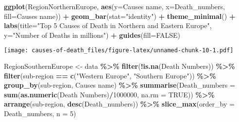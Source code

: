 \documentclass[
]{article}
\newenvironment{Shaded}{\begin{snugshade}}{\end{snugshade}}
\newcommand{\AttributeTok}[1]{\textcolor[rgb]{0.13,0.29,0.53}{#1}}
\newcommand{\ConstantTok}[1]{\textcolor[rgb]{0.56,0.35,0.01}{#1}}
\newcommand{\DecValTok}[1]{\textcolor[rgb]{0.00,0.00,0.81}{#1}}
\newcommand{\FunctionTok}[1]{\textcolor[rgb]{0.13,0.29,0.53}{\textbf{#1}}}
\newcommand{\NormalTok}[1]{#1}
\newcommand{\OtherTok}[1]{\textcolor[rgb]{0.56,0.35,0.01}{#1}}
\newcommand{\SpecialCharTok}[1]{\textcolor[rgb]{0.81,0.36,0.00}{\textbf{#1}}}
\newcommand{\StringTok}[1]{\textcolor[rgb]{0.31,0.60,0.02}{#1}}
\begin{document}
\begin{Shaded}
\begin{Highlighting}[]
\FunctionTok{ggplot}\NormalTok{(RegionNorthernEurope, }\FunctionTok{aes}\NormalTok{(}\AttributeTok{y=}\StringTok{\textasciigrave{}}\AttributeTok{Causes name}\StringTok{\textasciigrave{}}\NormalTok{, }\AttributeTok{x=}\NormalTok{Death\_numbers, }\AttributeTok{fill=}\StringTok{\textasciigrave{}}\AttributeTok{Causes name}\StringTok{\textasciigrave{}}\NormalTok{)) }\SpecialCharTok{+}
  \FunctionTok{geom\_bar}\NormalTok{(}\AttributeTok{stat=}\StringTok{"identity"}\NormalTok{) }\SpecialCharTok{+}
  \FunctionTok{theme\_minimal}\NormalTok{() }\SpecialCharTok{+} 
  \FunctionTok{labs}\NormalTok{(}\AttributeTok{title=}\StringTok{"Top 5 Causes of Death in Northern and Eastern Europe"}\NormalTok{,}
       \AttributeTok{y=}\StringTok{"Number of Deaths in millions"}\NormalTok{) }\SpecialCharTok{+}
  \FunctionTok{guides}\NormalTok{(}\AttributeTok{fill=}\ConstantTok{FALSE}\NormalTok{)}
\end{Highlighting}
\end{Shaded}

\texttt{[image: causes-of-death\_files/figure-latex/unnamed-chunk-10-1.pdf]}

\begin{Shaded}
\begin{Highlighting}[]
\NormalTok{RegionSouthernEurope }\OtherTok{\textless{}{-}}\NormalTok{ data }\SpecialCharTok{\%\textgreater{}\%}
  \FunctionTok{filter}\NormalTok{(}\SpecialCharTok{!}\FunctionTok{is.na}\NormalTok{(}\StringTok{\textasciigrave{}}\AttributeTok{Death Numbers}\StringTok{\textasciigrave{}}\NormalTok{)) }\SpecialCharTok{\%\textgreater{}\%}
  \FunctionTok{filter}\NormalTok{(}\StringTok{\textasciigrave{}}\AttributeTok{sub{-}region}\StringTok{\textasciigrave{}} \SpecialCharTok{==} \FunctionTok{c}\NormalTok{(}\StringTok{"Western Europe"}\NormalTok{, }\StringTok{"Southern Europe"}\NormalTok{)) }\SpecialCharTok{\%\textgreater{}\%}
  \FunctionTok{group\_by}\NormalTok{(}\StringTok{\textasciigrave{}}\AttributeTok{sub{-}region}\StringTok{\textasciigrave{}}\NormalTok{, }\StringTok{\textasciigrave{}}\AttributeTok{Causes name}\StringTok{\textasciigrave{}}\NormalTok{) }\SpecialCharTok{\%\textgreater{}\%}
  \FunctionTok{summarise}\NormalTok{(}\AttributeTok{Death\_numbers =} \FunctionTok{sum}\NormalTok{(}\FunctionTok{as.numeric}\NormalTok{(}\StringTok{\textasciigrave{}}\AttributeTok{Death Numbers}\StringTok{\textasciigrave{}}\NormalTok{)}\SpecialCharTok{/}\DecValTok{1000000}\NormalTok{, }\AttributeTok{na.rm =} \ConstantTok{TRUE}\NormalTok{)) }\SpecialCharTok{\%\textgreater{}\%}
  \FunctionTok{arrange}\NormalTok{(}\StringTok{\textasciigrave{}}\AttributeTok{sub{-}region}\StringTok{\textasciigrave{}}\NormalTok{, }\FunctionTok{desc}\NormalTok{(Death\_numbers)) }\SpecialCharTok{\%\textgreater{}\%}
  \FunctionTok{slice\_max}\NormalTok{(}\AttributeTok{order\_by =}\NormalTok{ Death\_numbers, }\AttributeTok{n =} \DecValTok{5}\NormalTok{)}
\end{Highlighting}
\end{Shaded}
\end{document}
